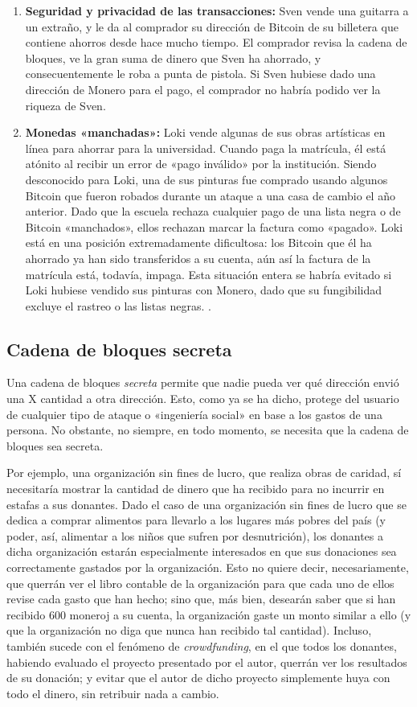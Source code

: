 \documentclass[12pt,a4paper,twoside]{book}
\begin{document}
\begin{enumerate}
\item \textbf{Seguridad y privacidad de las transacciones:} Sven vende una guitarra a un extraño, y le da al comprador su dirección de Bitcoin de su billetera que contiene ahorros desde hace mucho tiempo. El comprador revisa la cadena de bloques, ve la gran suma de dinero que Sven ha ahorrado, y consecuentemente le roba a punta de pistola. Si Sven hubiese dado una dirección de Monero para el pago, el comprador no habría podido ver la riqueza de Sven.
\item \textbf{Monedas «manchadas»:} Loki vende algunas de sus obras artísticas en línea para ahorrar para la universidad. Cuando paga la matrícula, él está atónito al recibir un error de «pago inválido» por la institución. Siendo desconocido para Loki, una de sus pinturas fue comprado usando algunos Bitcoin que fueron robados durante un ataque a una casa de cambio el año anterior. Dado que la escuela rechaza cualquier pago de una lista negra o de Bitcoin «manchados», ellos rechazan marcar la factura como «pagado». Loki está en una posición extremadamente dificultosa: los Bitcoin que él ha ahorrado ya han sido transferidos a su cuenta, aún así la factura de la matrícula está, todavía, impaga. Esta situación entera se habría evitado si Loki hubiese vendido sus pinturas con Monero, dado que su fungibilidad excluye el rastreo o las listas negras. \cite[págs. 29-30]{monero:master}.
\end{enumerate}

\subsection{Cadena de bloques secreta}
Una cadena de bloques \textit{secreta} permite que nadie pueda ver qué dirección envió una X cantidad a otra dirección. Esto, como ya se ha dicho, protege del usuario de cualquier tipo de ataque o «ingeniería social» en base a los gastos de una persona. No obstante, no siempre, en todo momento, se necesita que la cadena de bloques sea secreta.

Por ejemplo, una organización sin fines de lucro, que realiza obras de caridad, sí necesitaría mostrar la cantidad de dinero que ha recibido para no incurrir en estafas a sus donantes. Dado el caso de una organización sin fines de lucro que se dedica a comprar alimentos para llevarlo a los lugares más pobres del país (y poder, así, alimentar a los niños que sufren por desnutrición), los donantes a dicha organización estarán especialmente interesados en que sus donaciones sea correctamente gastados por la organización. Esto no quiere decir, necesariamente, que querrán ver el libro contable de la organización para que cada uno de ellos revise cada gasto que han hecho; sino que, más bien, desearán saber que si han recibido 600 moneroj a su cuenta, la organización gaste un monto similar a ello (y que la organización no diga que nunca han recibido tal cantidad). Incluso, también sucede con el fenómeno de \textit{crowdfunding}, en el que todos los donantes, habiendo evaluado el proyecto presentado por el autor, querrán ver los resultados de su donación; y evitar que el autor de dicho proyecto simplemente huya con todo el dinero, sin retribuir nada a cambio.
\end{document}
